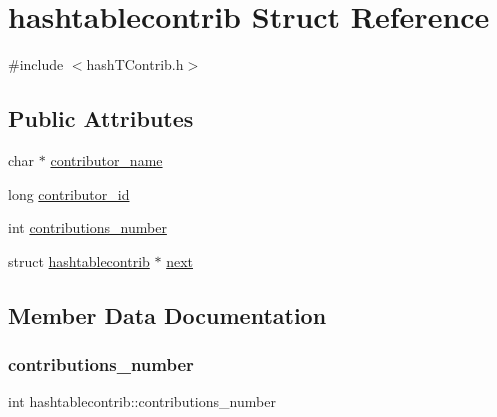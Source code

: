 \hypertarget{structhashtablecontrib}{}\section{hashtablecontrib Struct Reference}
\label{structhashtablecontrib}


{\ttfamily \#include $<$hash\+T\+Contrib.\+h$>$}

\subsection*{Public Attributes}
\begin{DoxyCompactItemize}
\item 
char $\ast$ \hyperlink{structhashtablecontrib_a2719a86606a7ba0016f1fc9c136dd48e}{contributor\+\_\+name}
\item 
long \hyperlink{structhashtablecontrib_aebc4590508d80344242223347caf9f84}{contributor\+\_\+id}
\item 
int \hyperlink{structhashtablecontrib_a20810f250147699004005e8fc106535a}{contributions\+\_\+number}
\item 
struct \hyperlink{structhashtablecontrib}{hashtablecontrib} $\ast$ \hyperlink{structhashtablecontrib_a84d60e652bf58593ee3c6eab306c216e}{next}
\end{DoxyCompactItemize}


\subsection{Member Data Documentation}
\mbox{\label{structhashtablecontrib_a20810f250147699004005e8fc106535a}} 
\subsubsection{\texorpdfstring{contributions\+\_\+number}{contributions\_number}}
{\footnotesize\ttfamily int hashtablecontrib\+::contributions\+\_\+number}

\mbox{\label{structhashtablecontrib_aebc4590508d80344242223347caf9f84}} 
